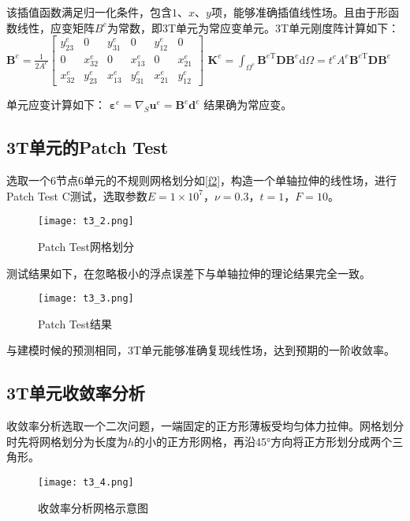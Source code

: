 \documentclass[forprint]{WHUBachelor}
\begin{document}
该插值函数满足归一化条件，包含$ 1、x、y $项，能够准确插值线性场。且由于形函数线性，应变矩阵$ B^{e} $为常数，即3T单元为常应变单元。3T单元刚度阵计算如下：
$ \boldsymbol{B}^{e}=\frac{1}{2 A^{e}}\left[\begin{array}{cccccc}{y_{23}^{e}} & {0} & {y_{31}^{e}} & {0} & {y_{12}^{e}} & {0} \\ {0} & {x_{32}^{e}} & {0} & {x_{13}^{e}} & {0} & {x_{21}^{e}} \\ {x_{32}^{e}} & {y_{23}^{e}} & {x_{13}^{e}} & {y_{31}^{e}} & {x_{21}^{e}} & {y_{12}^{e}}\end{array}\right] $
$ \boldsymbol{K}^{e}=\int_{\Omega^{e}} \boldsymbol{B}^{e \mathrm{T}} \boldsymbol{D} \boldsymbol{B}^{e} \mathrm{d} \Omega=t^{e} A^{e} \boldsymbol{B}^{e \mathrm{T}} \boldsymbol{D} \boldsymbol{B}^{e} $

单元应变计算如下：
$ \boldsymbol{\varepsilon}^{e}=\nabla_{S} \boldsymbol{u}^{e}=\boldsymbol{B}^{e} \boldsymbol{d}^{e} $
结果确为常应变。

\subsection {3T单元的Patch Test}
选取一个6节点6单元的不规则网格划分如\ref{f2}，构造一个单轴拉伸的线性场，进行Patch Test C测试，选取参数$E=1×10^{7}$，$\nu=0.3$，$t=1$，$F=10$。

\begin{figure}[H]
\centering  
\texttt{[image: t3\_2.png]} 
\caption{Patch Test网格划分} 
\label{f1.2} 
\end{figure}

测试结果如下，在忽略极小的浮点误差下与单轴拉伸的理论结果完全一致。

\begin{figure}[H]
\centering  
\texttt{[image: t3\_3.png]} 
\caption{Patch Test结果} 
\label{f1.3} 
\end{figure}

与建模时候的预测相同，3T单元能够准确复现线性场，达到预期的一阶收敛率。

\subsection {3T单元收敛率分析}
收敛率分析选取一个二次问题，一端固定的正方形薄板受均匀体力拉伸。网格划分时先将网格划分为长度为$h$的小的正方形网格，再沿45°方向将正方形划分成两个三角形。

\begin{figure}[H]
\centering  
\texttt{[image: t3\_4.png]} 
\caption{收敛率分析网格示意图} 
\label{f1.4} 
\end{figure}
\end{document}
